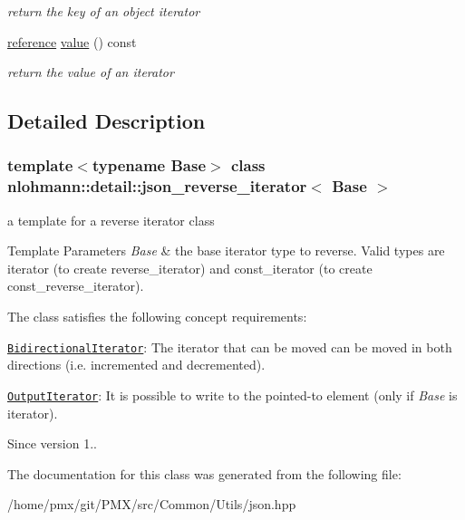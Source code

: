 \begin{DoxyCompactItemize}
\begin{DoxyCompactList}\small\item\em return the key of an object iterator \end{DoxyCompactList}\item 
\mbox{\label{classnlohmann_1_1detail_1_1json__reverse__iterator_ae22803d442d483041d17239615f83b58}} 
\hyperlink{classnlohmann_1_1detail_1_1json__reverse__iterator_a42f51a69bac7b2aebb613b2164e457f1}{reference} \hyperlink{classnlohmann_1_1detail_1_1json__reverse__iterator_ae22803d442d483041d17239615f83b58}{value} () const
\begin{DoxyCompactList}\small\item\em return the value of an iterator \end{DoxyCompactList}\end{DoxyCompactItemize}


\subsection{Detailed Description}
\subsubsection*{template$<$typename Base$>$\newline
class nlohmann\+::detail\+::json\+\_\+reverse\+\_\+iterator$<$ Base $>$}

a template for a reverse iterator class 


\begin{DoxyTemplParams}{Template Parameters}
{\em Base} & the base iterator type to reverse. Valid types are iterator (to create reverse\+\_\+iterator) and const\+\_\+iterator (to create const\+\_\+reverse\+\_\+iterator).\\
\hline
\end{DoxyTemplParams}
The class satisfies the following concept requirements\+:
\begin{DoxyItemize}
\item \href{https://en.cppreference.com/w/cpp/named_req/BidirectionalIterator}{\tt Bidirectional\+Iterator}\+: The iterator that can be moved can be moved in both directions (i.\+e. incremented and decremented).
\item \href{https://en.cppreference.com/w/cpp/named_req/OutputIterator}{\tt Output\+Iterator}\+: It is possible to write to the pointed-\/to element (only if {\itshape Base} is iterator).
\end{DoxyItemize}

\begin{DoxySince}{Since}
version 1.. 
\end{DoxySince}


The documentation for this class was generated from the following file\+:\begin{DoxyCompactItemize}
\item 
/home/pmx/git/\+P\+M\+X/src/\+Common/\+Utils/json.\+hpp\end{DoxyCompactItemize}
